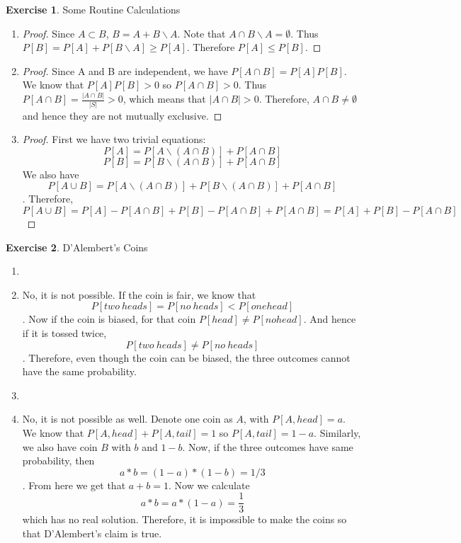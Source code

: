 \documentclass[12pt,a4paper]{article}
\makeatletter
\theoremstyle{definition}
\newtheorem{exercise}{Exercise}
\newtheorem*{solution}{Solution}
\renewenvironment{solution}[1][Solution] {\par\pushQED{\qed}\normalfont\topsep6\p@\@plus6\p@\relax\trivlist\item[\hskip\labelsep\bfseries#1\@addpunct{.}]\ignorespaces}{\popQED\endtrivlist\@endpefalse} \makeatother
\makeatother
\begin{document}
\begin{exercise}
Some Routine Calculations
\begin{enumerate}[label=\roman*)]
\item
\begin{proof}
    Since $A\subset B$, $B=A+B\backslash A$. Note that $A \cap B \backslash A = \emptyset $. Thus $P[B]=P[A]+P[B\backslash A]\geq P[A]$. Therefore $P[A]\leq P[B]$.
\end{proof}
\item
\begin{proof}
    Since A and B are independent, we have $P[A\cap B]=P[A]P[B]$. We know that $P[A]P[B]>0$ so $P[A\cap B]>0$. Thus $P[A\cap B]=\frac{|A\cap B|}{|S|}>0$, which means that $|A\cap B|> 0$. Therefore, $A\cap B\neq \emptyset$ and hence they are not mutually exclusive.
\end{proof}
\item
\begin{proof}
    First we have two trivial equations:
    $$P[A]=P[A\backslash (A\cap B)]+P[A\cap B]$$
    $$P[B]=P[B\backslash (A\cap B)]+P[A\cap B]$$
    We also have
    $$P[A\cup B]=P[A\backslash (A\cap B)]+P[B\backslash (A\cap B)]+P[A\cap B]$$.
    Therefore,
    $$P[A\cup B]=P[A]-P[A\cap B]+P[B]-P[A\cap B]+P[A\cap B]=P[A]+P[B]-P[A\cap B]$$
\end{proof}
\end{enumerate}
\end{exercise}
\begin{exercise}
    D'Alembert's Coins
    \begin{enumerate}[label=\roman*)]
        \item
        \begin{solution}
            No, it is not possible. If the coin is fair, we know that $$P[two\ heads]=P[no \ heads] < P[one head]$$. Now if the coin is biased, for that coin $P[head]\neq P[no head]$. And hence if it is tossed twice, $$P[two \ heads]\neq P[no \ heads]$$. Therefore, even though the coin can be biased, the three outcomes cannot have the same probability.
        \end{solution}
        \item 
        \begin{solution}
            No, it is not possible as well. Denote one coin as $A$, with $P[A,head]=a$. We know that $P[A,head]+P[A,tail]=1$ so $P[A,tail]=1-a$. Similarly, we also have coin $B$ with $b$ and $1-b$. Now, if the three outcomes have same probability, then $$a*b=(1-a)*(1-b)=1/3$$. From here we get that $a+b=1$. Now we calculate $$a*b=a*(1-a)=\frac{1}{3}$$ which has no real solution. Therefore, it is impossible to make the coins so that D'Alembert's claim is true.
        \end{solution}
    \end{enumerate}
\end{exercise}
\end{document}
